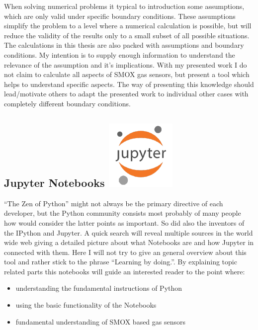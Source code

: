 \documentclass[11pt]{article}
\providecommand{\tightlist}{%
      \setlength{\itemsep}{0pt}\setlength{\parskip}{0pt}}
\begin{document}
When solving numerical problems it typical to introduction some
assumptions, which are only valid under specific boundary conditions.
These assumptions simplify the problem to a level where a numerical
calculation is possible, but will reduce the validity of the results
only to a small subset of all possible situations. The calculations in
this thesis are also packed with assumptions and boundary conditions. My
intention is to supply enough information to understand the relevance of
the assumption and it's implications. With my presented work I do not
claim to calculate all aspects of SMOX gas sensors, but present a tool
which helps to understand specific aspects. The way of presenting this
knowledge should lead/motivate others to adapt the presented work to
individual other cases with completely different boundary conditions.

    \hypertarget{jupyter-notebooks-juypter}{%
\subsection[Jupyter Notebooks ]{\texorpdfstring{Jupyter Notebooks
\protect\includegraphics{media/icons/jupyter.png}}{Jupyter Notebooks Juypter}}\label{jupyter-notebooks-juypter}}

``The Zen of Python'' might not always be the primary directive of each
developer, but the Python community consists most probably of many
people how would consider the latter points as important. So did also
the inventors of the IPython and Jupyter. A quick search will reveal
multiple sources in the world wide web giving a detailed picture about
what Notebooks are and how Jupyter in connected with them. Here I will
not try to give an general overview about this tool and rather stick to
the phrase ``Learning by doing.''. By explaining topic related parts
this notebooks will guide an interested reader to the point where:

\begin{itemize}
\tightlist
\item
  understanding the fundamental instructions of Python
\item
  using the basic functionality of the Notebooks
\item
  fundamental understanding of SMOX based gas sensors
\end{itemize}
\end{document}

